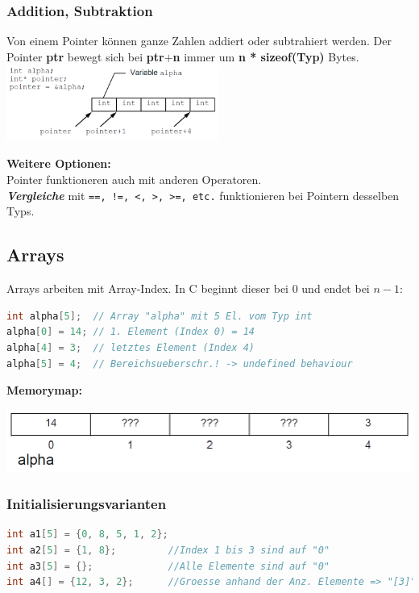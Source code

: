 		\subsubsection{Addition, Subtraktion}
			Von einem Pointer können ganze Zahlen addiert oder subtrahiert werden. Der Pointer \textbf{ptr} bewegt sich bei \textbf{ptr$+$n} immer um \textbf{n * sizeof(Typ)} Bytes. \\
			\includegraphics[height=2.5cm]{Bilder/ptr_add-subtraction.png}

			\textbf{Weitere Optionen:}\\
				Pointer funktioneren auch mit anderen Operatoren.\\
				\textbf{\textit{Vergleiche}} mit \verb|==, !=, <, >, >=, etc.| funktionieren bei Pointern desselben Typs.

	\subsection{Arrays}
			Arrays arbeiten mit Array-Index. In C beginnt dieser bei 0 und endet bei $n-1$:
			\begin{lstlisting}[language=C]
int alpha[5];  // Array "alpha" mit 5 El. vom Typ int
alpha[0] = 14; // 1. Element (Index 0) = 14
alpha[4] = 3;  // letztes Element (Index 4)
alpha[5] = 4;  // Bereichsueberschr.! -> undefined behaviour
			\end{lstlisting}
			\textbf{Memorymap:}\\
				\begin{minipage}{1\linewidth}
					\includegraphics[width=0.5\linewidth]{Bilder/arr-mem-map.png}
				\end{minipage}

		\subsubsection{Initialisierungsvarianten}
			\begin{lstlisting}[language=C]
int a1[5] = {0, 8, 5, 1, 2};
int a2[5] = {1, 8};         //Index 1 bis 3 sind auf "0"
int a3[5] = {};             //Alle Elemente sind auf "0"
int a4[] = {12, 3, 2};      //Groesse anhand der Anz. Elemente => "[3]"
			\end{lstlisting}

